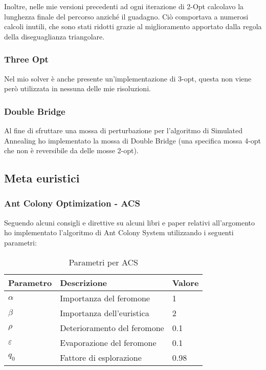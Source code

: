 \documentclass{article}
\begin{document}
Inoltre, nelle mie versioni precedenti ad ogni iterazione
di 2-Opt calcolavo la lunghezza finale del percorso anziché il guadagno. Ciò comportava
a numerosi calcoli inutili, che sono stati ridotti grazie al miglioramento apportato
dalla regola della diseguaglianza triangolare.

\subsubsection{Three Opt}
Nel mio solver è anche presente un'implementazione di 3-opt,
questa non viene però utilizzata in nessuna delle mie risoluzioni.

\subsubsection{Double Bridge}
Al fine di sfruttare una mossa di perturbazione per l'algoritmo di Simulated Annealing
ho implementato la mossa di Double Bridge (una specifica mossa 4-opt che non è reversibile
da delle mosse 2-opt).

\subsection{Meta euristici}
\subsubsection{Ant Colony Optimization - ACS}
Seguendo alcuni consigli e direttive su alcuni libri e paper relativi all'argomento
\cite{aco} \cite{aco-paper} ho implementato l'algoritmo di Ant Colony System utilizzando i seguenti parametri:

\begin{table}
    \begin{center}
        \begin{tabular}{|l|l|l|}
            \hline
            Parametro     & Descrizione                 & Valore \\
            \hline
            $\alpha$      & Importanza del feromone     & 1      \\
            $\beta$       & Importanza dell'euristica   & 2      \\
            $\rho$        & Deterioramento del feromone & 0.1    \\
            $\varepsilon$ & Evaporazione del feromone   & 0.1    \\
            $q_0$         & Fattore di esplorazione     & 0.98   \\
            \hline
        \end{tabular}
    \end{center}
    \caption{Parametri per ACS}
\end{table}
\end{document}
